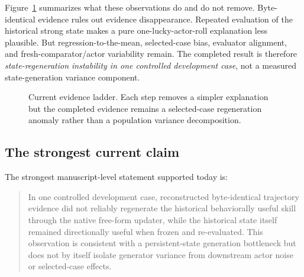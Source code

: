 Figure~\ref{fig:localization} summarizes what these observations do and do not remove. Byte-identical evidence rules out evidence disappearance. Repeated evaluation of the historical strong state makes a pure one-lucky-actor-roll explanation less plausible. But regression-to-the-mean, selected-case bias, evaluator alignment, and fresh-comparator/actor variability remain. The completed result is therefore \emph{state-regeneration instability in one controlled development case}, not a measured state-generation variance component.

\begin{figure}[t]
\centering
{}
\caption{Current evidence ladder. Each step removes a simpler explanation but the completed evidence remains a selected-case regeneration anomaly rather than a population variance decomposition.}
\label{fig:localization}
\end{figure}

\subsection{The strongest current claim}
The strongest manuscript-level statement supported today is:

\begin{quote}
In one controlled development case, reconstructed byte-identical trajectory evidence did not reliably regenerate the historical behaviorally useful skill through the native free-form updater, while the historical state itself remained directionally useful when frozen and re-evaluated. This observation is consistent with a persistent-state generation bottleneck but does not by itself isolate generator variance from downstream actor noise or selected-case effects.
\end{quote}

